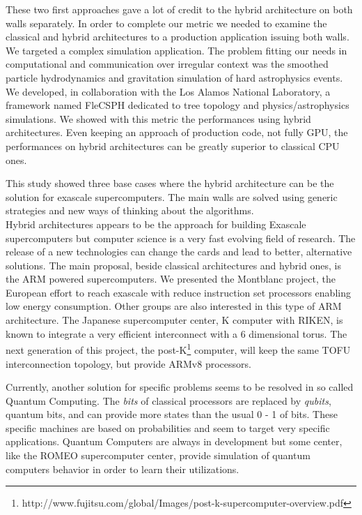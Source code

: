 These two first approaches gave a lot of credit to the hybrid architecture on both walls separately. 
In order to complete our metric we needed to examine the classical and hybrid architectures to a production application issuing both walls. 
We targeted a complex simulation application. 
The problem fitting our needs in computational and communication over irregular context was the smoothed particle hydrodynamics and gravitation simulation of hard astrophysics events. 
We developed, in collaboration with the Los Alamos National Laboratory, a framework named FleCSPH dedicated to tree topology and physics/astrophysics simulations. 
We showed with this metric the performances using hybrid architectures. 
Even keeping an approach of production code, not fully GPU, the performances on hybrid architectures can be greatly superior to classical CPU ones. 

This study showed three base cases where the hybrid architecture can be the solution for exascale supercomputers.
The main walls are solved using generic strategies and new ways of thinking about the algorithms. \\

Hybrid architectures appears to be the approach for building Exascale supercomputers but computer science is a very fast evolving field of research.  
The release of a new technologies can change the cards and lead to better, alternative solutions.
The main proposal, beside classical architectures and hybrid ones, is the ARM powered supercomputers. 
We presented the Montblanc project, the European effort to reach exascale with reduce instruction set processors enabling low energy consumption. 
Other groups are also interested in this type of ARM architecture. 
The Japanese supercomputer center, K computer with RIKEN, is known to integrate a very efficient interconnect with a 6 dimensional torus.
The next generation of this project, the post-K\footnote{http://www.fujitsu.com/global/Images/post-k-supercomputer-overview.pdf} computer, will keep the same TOFU interconnection topology, but provide ARMv8 processors. 

Currently, another solution for specific problems seems to be resolved in so called Quantum Computing.
The \textit{bits} of classical processors are replaced by \textit{qubits}, quantum bits, and can provide more states than the usual 0 - 1 of bits.
These specific machines are based on probabilities and seem to target very specific applications. 
Quantum Computers are always in development but some center, like the ROMEO supercomputer center, provide simulation of quantum computers behavior in order to learn their utilizations.\\

